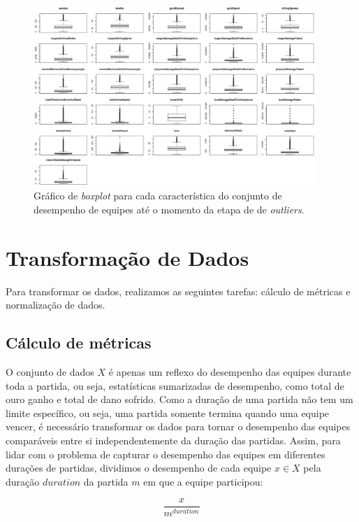 \begin{figure}
  \centering
  \includegraphics[angle=90,width=0.95\textwidth]{boxplots}%
  \caption{Gráfico de \textit{boxplot} para cada característica do conjunto de desempenho de equipes até o momento da etapa de  de \textit{outliers}.}
  \label{fig:boxplots}
\end{figure}

\section{Transformação de Dados}
Para transformar os dados, realizamos as seguintes tarefas: cálculo de métricas e normalização de dados.

\subsection{Cálculo de métricas}

O conjunto de dados $X$ é apenas um reflexo do desempenho das equipes durante toda a partida, ou seja, estatísticas sumarizadas de desempenho, como total de ouro ganho e total de dano sofrido. Como a duração de uma partida não tem um limite específico, ou seja, uma partida somente termina quando uma equipe vencer, é necessário transformar os dados para tornar o desempenho das equipes comparáveis entre si independentemente da duração das partidas. Assim, para lidar com o problema de capturar o desempenho das equipes em diferentes durações de partidas, dividimos o desempenho de cada equipe $x \in X$ pela duração $duration$ da partida $m$ em que a equipe participou:

\begin{displaymath}
  \frac{x}{m^{duration}}
\end{displaymath}

